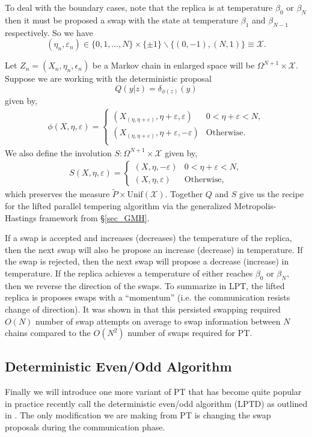 \documentclass[12pt]{article}
\newcommand{\eps}{\varepsilon}
\begin{document}
To deal with the boundary cases, note that the replica is at temperature $\beta_0$ or $\beta_N$ then it must be proposed a swap with the state at temperature $\beta_1$ and $\beta_{N-1}$ respectively. So we have
\[(\eta_n,\varepsilon_n)\in \{0,1,\dots,N\}\times\{\pm 1\}\backslash\{(0,-1),(N,1)\}\equiv \mathcal{X}. \]

Let $Z_n=(X_n,\eta_n,\epsilon_n)$ be a Markov chain in enlarged space will be $\Omega^{N+1}\times\mathcal{X}$. Suppose we are working with the deterministic proposal
\[Q(y|z)=\delta_{\phi(z)}(y)\]
given by, 
\begin{align*}
\phi(X,\eta,\eps)=
\begin{cases}
(X_{(\eta,\eta+\eps)},\eta+\eps,\eps) &   0<\eta+\eps<N,\\
(X_{(\eta,\eta+\eps)},\eta+\eps,-\eps) &  \mathrm{Otherwise}.\\
\end{cases}
\end{align*}
We also define the involution $S:\Omega^{N+1}\times\mathcal{X}$ given by,
\begin{align*}
S(X,\eta,\eps)=
\begin{cases}
(X,\eta,-\eps) &   0<\eta+\eps<N,\\
(X,\eta,\eps) &  \mathrm{Otherwise},
\end{cases}
\end{align*}
which preserves the measure $\tilde{P}\times\mathrm{Unif}(\mathcal{X})$. Together $Q$ and $S$ give us the recipe for the lifted parallel tempering algorithm via the generalized Metropolis-Hastings framework from \S\ref{sec_GMH}.

If a swap is accepted and increases (decreases) the temperature of the replica, then the next swap will also be propose an increase (decrease) in temperature. If the swap is rejected, then the next swap will propose a decrease (increase) in temperature. If the replica achieves a temperature of either reaches $\beta_0$ or $\beta_N$, then we reverse the direction of the swaps. To summarize in LPT, the lifted replica is proposes swaps with a ``momentum'' (i.e. the communication resists change of direction). It was shown in \cite{diaconis2000analysis} that this persisted swapping required $O(N)$ number of swap attempts on average to swap information between $N$ chains compared to the $O(N^2)$ number of swaps required for PT.

\subsection{Deterministic Even/Odd Algorithm}
Finally we will introduce one more variant of PT that has become quite popular in practice recently call the deterministic even/odd algorithm (LPTD) as outlined in \cite{lingenheil2009efficiency}. The only modification we are making from PT is changing the swap proposals during the communication phase. 
\end{document}

